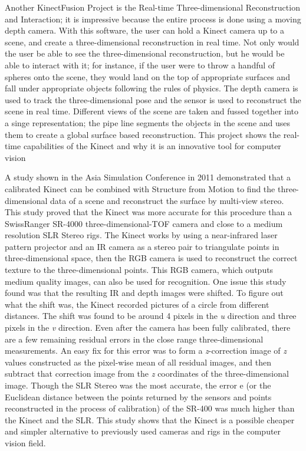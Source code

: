 \documentclass[pdftex,10.5pt]{report}
\begin{document}
Another KinectFusion Project is the Real-time Three-dimensional Reconstruction and Interaction; it is impressive because the entire process is done using a moving depth camera. With this software, the user can hold a Kinect camera up to a scene, and create a three-dimensional reconstruction in real time. Not only would the user be able to see the three-dimensional reconstruction, but he would be able to interact with it; for instance, if the user were to throw a handful of spheres onto the scene, they would land on the top of appropriate surfaces and fall under appropriate objects following the rules of physics. The depth camera is used to track the three-dimensional pose and the sensor is used to reconstruct the scene in real time. Different views of the scene are taken and fussed together into a singe representation; the pipe line segments the objects in the scene and uses them to create a global surface based reconstruction. This project shows the real-time capabilities of the Kinect and why it is an innovative tool for computer vision

A study shown in the Asia Simulation Conference in 2011 demonstrated that a calibrated Kinect can be combined with Structure from Motion to find the three-dimensional data of a scene and reconstruct the surface by multi-view stereo. This study proved that the Kinect was more accurate for this procedure than a SwissRanger SR-4000 three-dimensional-TOF camera and close to a medium resolution SLR Stereo rigs. The Kinect works by using a near-infrared laser pattern projector and an IR camera as a stereo pair to triangulate points in three-dimensional space, then the RGB camera is used to reconstruct the correct texture to the three-dimensional points. This RGB camera, which outputs medium quality images, can also be used for recognition. One issue this study found was that the resulting IR and depth images were shifted. To figure out what the shift was, the Kinect recorded pictures of a circle from different distances. The shift was found to be around 4 pixels in the \emph{u} direction and three pixels in the \emph{v} direction. Even after the camera has been fully calibrated, there are a few remaining residual errors in the close range three-dimensional measurements. An easy fix for this error was to form a \emph{z}-correction image of \emph{z} values constructed as the pixel-wise mean of all residual images, and then subtract that correction image from the \emph{z} coordinates of the three-dimensional image.\cite{cite1} Though the SLR Stereo was the most accurate, the error e (or the Euclidean distance between the points returned by the sensors and points reconstructed in the process of calibration) of the SR-400 was much higher than the Kinect and the SLR. This study shows that the Kinect is a possible cheaper and simpler alternative to previously used cameras and rigs in the computer vision field.
\end{document}
